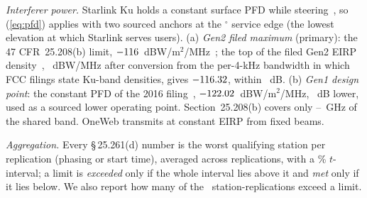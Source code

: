 \documentclass[conference]{IEEEtran}
\begin{document}
\emph{Interferer power.} Starlink Ku holds a constant surface PFD while
steering~\cite{fcc2291}, so (\ref{eq:pfd}) applies with two sourced anchors at
the \PfdAnchorElevDeg$^\circ$ service edge (the lowest elevation at which Starlink
serves users). (a) \emph{Gen2 filed maximum} (primary): the 47 CFR~25.208(b)
limit, $-116$~dBW/m$^2$/MHz~\cite{cfr25208}; the top of the filed Gen2
EIRP density~\cite{fcc2291}, \StarlinkFiledTopDbw~dBW/MHz after conversion from
the per-4-kHz bandwidth in which FCC filings state Ku-band densities, gives
$-116.32$, within \FiledPfdOffsetDb~dB. (b) \emph{Gen1 design point}: the
constant PFD of the 2016 filing~\cite[Table~A.7-1]{spacex2016},
$-122.02$~dBW/m$^2$/MHz, \PfdOffsetGenOneDb~dB lower, used as a sourced
lower operating point. Section~25.208(b) covers only
\PfdScopeLoGhz--\PfdScopeHiGhz~GHz of the shared band. OneWeb transmits at
constant EIRP from fixed beams.

\emph{Aggregation.} Every \S\,25.261(d) number is the worst qualifying station per
replication (phasing or start time), averaged across replications, with a
\CiPct\% $t$-interval; a limit is \emph{exceeded} only if the whole interval lies
above it and \emph{met} only if it lies below. We also report how many of the
\FilGenTwoReps\ station-replications exceed a limit.
\end{document}
